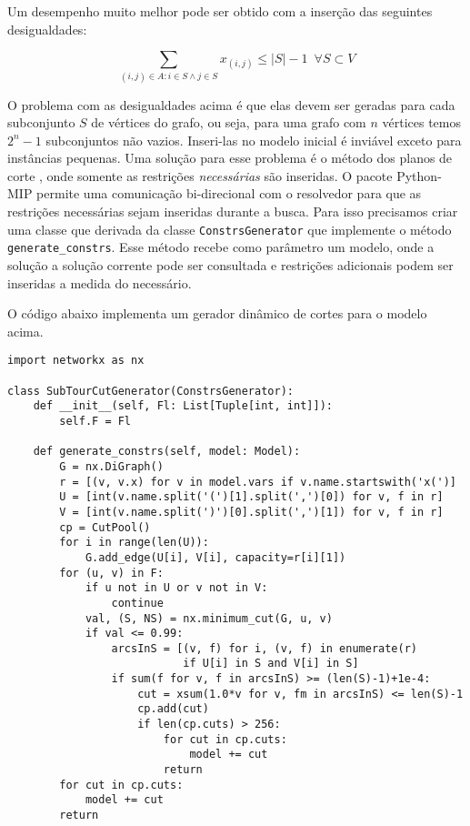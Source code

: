 \documentclass[a4paper,11pt,fleqn]{article}
\begin{document}
Um desempenho muito melhor pode ser obtido com a inserção das seguintes desigualdades:

\begin{equation}
\sum_{(i,j) \in A : i\in S \land j \in S} x_{(i,j)} \leq |S|-1 \,\,\, \forall S \subset V 
\end{equation}

O problema com as desigualdades acima é que elas devem ser geradas para cada subconjunto $S$ de vértices do grafo, ou seja, para uma grafo com $n$ vértices temos $2^n-1$ subconjuntos não vazios. Inseri-las no modelo inicial é inviável exceto para instâncias pequenas. Uma solução para esse problema é o método dos planos de corte \citep{Dantzig54}, onde somente as restrições \emph{necessárias} são inseridas. O pacote Python-MIP permite uma comunicação bi-direcional com o resolvedor para que as restrições necessárias sejam inseridas durante a busca. Para isso precisamos criar uma classe que derivada da classe \texttt{ConstrsGenerator} que implemente o método \texttt{generate\_constrs}. Esse método recebe como parâmetro um modelo, onde a solução a solução corrente pode ser consultada e restrições adicionais podem ser inseridas a medida do necessário.

O código abaixo implementa um gerador dinâmico de cortes para o modelo acima.

{\small
\begin{lstlisting}
import networkx as nx

class SubTourCutGenerator(ConstrsGenerator):
    def __init__(self, Fl: List[Tuple[int, int]]):
        self.F = Fl

    def generate_constrs(self, model: Model):
        G = nx.DiGraph()
        r = [(v, v.x) for v in model.vars if v.name.startswith('x(')]
        U = [int(v.name.split('(')[1].split(',')[0]) for v, f in r]
        V = [int(v.name.split(')')[0].split(',')[1]) for v, f in r]
        cp = CutPool()
        for i in range(len(U)):
            G.add_edge(U[i], V[i], capacity=r[i][1])
        for (u, v) in F:
            if u not in U or v not in V:
                continue
            val, (S, NS) = nx.minimum_cut(G, u, v)
            if val <= 0.99:
                arcsInS = [(v, f) for i, (v, f) in enumerate(r)
                           if U[i] in S and V[i] in S]
                if sum(f for v, f in arcsInS) >= (len(S)-1)+1e-4:
                    cut = xsum(1.0*v for v, fm in arcsInS) <= len(S)-1
                    cp.add(cut)
                    if len(cp.cuts) > 256:
                        for cut in cp.cuts:
                            model += cut
                        return
        for cut in cp.cuts:
            model += cut
        return
\end{lstlisting}}
\end{document}
